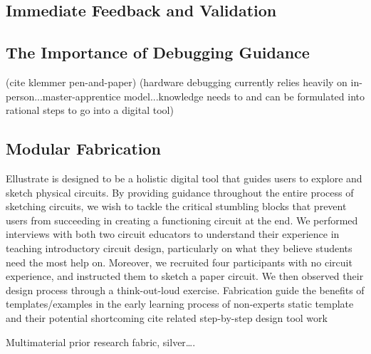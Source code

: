 \documentclass{sigchi}
\begin{document}
\subsection{Immediate Feedback and Validation}

\subsection{The Importance of Debugging Guidance}
(cite klemmer pen-and-paper) (hardware debugging currently relies heavily on in-person...master-apprentice model...knowledge needs to and can be formulated into rational steps to go into a digital tool)
\subsection{Modular Fabrication}
Ellustrate is designed to be a holistic digital tool that guides users to explore and sketch physical circuits. By providing guidance throughout the entire process of sketching circuits, we wish to tackle the critical stumbling blocks that prevent users from succeeding in creating a functioning circuit at the end. We performed interviews with both two circuit educators to understand their experience in teaching introductory circuit design, particularly on what they believe students need the most help on.  Moreover, we recruited four participants with no circuit experience, and instructed them to sketch a paper circuit. We then observed their design process through a think-out-loud exercise.
Fabrication guide
the benefits of templates/examples in the early learning process of non-experts
static template and their potential shortcoming
cite related step-by-step design tool work

Multimaterial prior research
fabric, silver….
\end{document}
